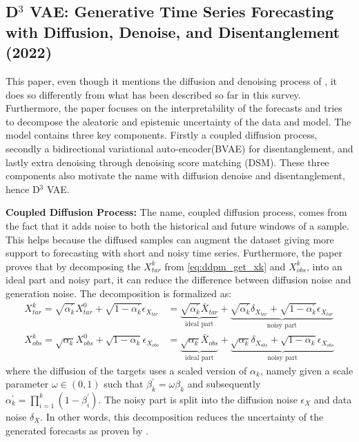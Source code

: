 \subsection{D$^3$ VAE: Generative Time Series Forecasting with Diffusion, Denoise, and Disentanglement (2022) \cite{li_generative_2022}} \label{sec:d3vae}
This paper, even though it mentions the diffusion and denoising process of \textcite{ho_denoising_2020}, it does so differently from what has been described so far in this survey. Furthermore, the paper focuses on the interpretability of the forecasts and tries to decompose the aleatoric and epistemic uncertainty of the data and model. 
The model contains three key components. Firstly a coupled diffusion process, secondly a bidirectional variational auto-encoder(BVAE) \cite{vahdat_nvae_2020} for disentanglement, and lastly extra denoising through denoising score matching (DSM).
These three components also motivate the name with diffusion denoise and disentanglement, hence D$^3$ VAE. 

\textbf{Coupled Diffusion Process:}
The name, coupled diffusion process, comes from the fact that it adds noise to both the historical and future windows of a sample. This helps because the diffused samples can augment the dataset giving more support to forecasting with short and noisy time series. Furthermore, the paper proves that by decomposing the $X_{tar}^k$ from \autoref{eq:ddpm_get_xk} and $X_{obs}^k$, into an ideal part and noisy part, it can reduce the difference between diffusion noise and generation noise. The decomposition is formalized as:
\begin{align}
    X_{tar}^k = \sqrt{\alpha_k^\prime}X_{tar}^0 + \sqrt{1 - \alpha_k^\prime}\epsilon_{X_{tar}} &= \underbrace{\sqrt{\alpha_k^\prime}\bar{X}_{tar}}_{\text{ideal part}} + \underbrace{\sqrt{\alpha_k^\prime}\delta_{X_{tar}} + \sqrt{1 - \alpha_k^\prime}\epsilon_{X_{tar}}}_{\text{noisy part}} \\
    X_{obs}^k = \sqrt{\alpha_k}X_{obs}^0 + \sqrt{1 - \alpha_k}\epsilon_{X_{obs}} &= \underbrace{\sqrt{\alpha_k}\bar{X}_{obs}}_{\text{ideal part}} + \underbrace{\sqrt{\alpha_k}\delta_{X_{obs}} + \sqrt{1 - \alpha_k}\epsilon_{X_{obs}}}_{\text{noisy part}}
\end{align}
where the diffusion of the targets uses a scaled version of $\alpha_k$, namely given a scale parameter $\omega \in (0, 1)$ such that $\beta_k^\prime = \omega \beta_k$ and subsequently $\alpha_k^\prime = \prod_{i=1}^k (1 - \beta_i^\prime)$. The noisy part is split into the diffusion noise $\epsilon_X$ and data noise $\delta_X$. In other words, this decomposition reduces the uncertainty of the generated forecasts as proven by \textcite{li_generative_2022}.

